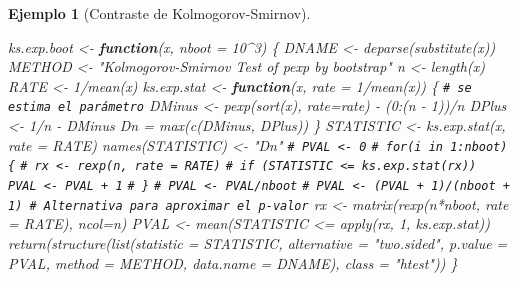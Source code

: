 \documentclass[
  10pt,
]{book}
\newenvironment{Shaded}{\begin{snugshade}}{\end{snugshade}}
\newcommand{\AttributeTok}[1]{\textcolor[rgb]{0.77,0.63,0.00}{#1}}
\newcommand{\CommentTok}[1]{\textcolor[rgb]{0.56,0.35,0.01}{\textit{#1}}}
\newcommand{\ControlFlowTok}[1]{\textcolor[rgb]{0.13,0.29,0.53}{\textbf{#1}}}
\newcommand{\DecValTok}[1]{\textcolor[rgb]{0.00,0.00,0.81}{#1}}
\newcommand{\FunctionTok}[1]{\textcolor[rgb]{0.00,0.00,0.00}{#1}}
\newcommand{\NormalTok}[1]{#1}
\newcommand{\OtherTok}[1]{\textcolor[rgb]{0.56,0.35,0.01}{#1}}
\newcommand{\SpecialCharTok}[1]{\textcolor[rgb]{0.00,0.00,0.00}{#1}}
\newcommand{\StringTok}[1]{\textcolor[rgb]{0.31,0.60,0.02}{#1}}
\theoremstyle{break}
\newtheorem{example}{Ejemplo}[chapter]
\theoremstyle{nonumberplain}
\renewcommand{\CommentTok}[1]{\textcolor[rgb]{0.41,0.41,0.41}{\texttt{#1}}}
\begin{document}
\begin{example}[Contraste de Kolmogorov-Smirnov]
\begin{Shaded}
\begin{Highlighting}[]
\NormalTok{ks.exp.boot }\OtherTok{\textless{}{-}} \ControlFlowTok{function}\NormalTok{(x, }\AttributeTok{nboot =} \DecValTok{10}\SpecialCharTok{\^{}}\DecValTok{3}\NormalTok{) \{}
\NormalTok{  DNAME }\OtherTok{\textless{}{-}} \FunctionTok{deparse}\NormalTok{(}\FunctionTok{substitute}\NormalTok{(x))}
\NormalTok{  METHOD }\OtherTok{\textless{}{-}} \StringTok{"Kolmogorov{-}Smirnov Test of pexp by bootstrap"} 
\NormalTok{  n }\OtherTok{\textless{}{-}} \FunctionTok{length}\NormalTok{(x)}
\NormalTok{  RATE }\OtherTok{\textless{}{-}} \DecValTok{1}\SpecialCharTok{/}\FunctionTok{mean}\NormalTok{(x)}
\NormalTok{  ks.exp.stat }\OtherTok{\textless{}{-}} \ControlFlowTok{function}\NormalTok{(x, }\AttributeTok{rate =} \DecValTok{1}\SpecialCharTok{/}\FunctionTok{mean}\NormalTok{(x)) \{ }\CommentTok{\# se estima el parámetro}
\NormalTok{    DMinus }\OtherTok{\textless{}{-}} \FunctionTok{pexp}\NormalTok{(}\FunctionTok{sort}\NormalTok{(x), }\AttributeTok{rate=}\NormalTok{rate) }\SpecialCharTok{{-}}\NormalTok{ (}\DecValTok{0}\SpecialCharTok{:}\NormalTok{(n }\SpecialCharTok{{-}} \DecValTok{1}\NormalTok{))}\SpecialCharTok{/}\NormalTok{n}
\NormalTok{    DPlus }\OtherTok{\textless{}{-}} \DecValTok{1}\SpecialCharTok{/}\NormalTok{n }\SpecialCharTok{{-}}\NormalTok{ DMinus}
\NormalTok{    Dn }\OtherTok{=} \FunctionTok{max}\NormalTok{(}\FunctionTok{c}\NormalTok{(DMinus, DPlus))}
\NormalTok{  \}  }
\NormalTok{  STATISTIC }\OtherTok{\textless{}{-}} \FunctionTok{ks.exp.stat}\NormalTok{(x, }\AttributeTok{rate =}\NormalTok{ RATE) }
  \FunctionTok{names}\NormalTok{(STATISTIC) }\OtherTok{\textless{}{-}} \StringTok{"Dn"}
  \CommentTok{\# PVAL \textless{}{-} 0}
  \CommentTok{\# for(i in 1:nboot) \{}
  \CommentTok{\#   rx \textless{}{-} rexp(n, rate = RATE)}
  \CommentTok{\#   if (STATISTIC \textless{}= ks.exp.stat(rx)) PVAL \textless{}{-} PVAL + 1}
  \CommentTok{\# \}}
  \CommentTok{\# PVAL \textless{}{-} PVAL/nboot}
  \CommentTok{\# PVAL \textless{}{-} (PVAL + 1)/(nboot + 1) \# Alternativa para aproximar el p{-}valor}
\NormalTok{  rx }\OtherTok{\textless{}{-}} \FunctionTok{matrix}\NormalTok{(}\FunctionTok{rexp}\NormalTok{(n}\SpecialCharTok{*}\NormalTok{nboot, }\AttributeTok{rate =}\NormalTok{ RATE), }\AttributeTok{ncol=}\NormalTok{n)}
\NormalTok{  PVAL }\OtherTok{\textless{}{-}} \FunctionTok{mean}\NormalTok{(STATISTIC }\SpecialCharTok{\textless{}=} \FunctionTok{apply}\NormalTok{(rx, }\DecValTok{1}\NormalTok{, ks.exp.stat))}
  \FunctionTok{return}\NormalTok{(}\FunctionTok{structure}\NormalTok{(}\FunctionTok{list}\NormalTok{(}\AttributeTok{statistic =}\NormalTok{ STATISTIC, }\AttributeTok{alternative =} \StringTok{"two.sided"}\NormalTok{, }
                   \AttributeTok{p.value =}\NormalTok{ PVAL, }\AttributeTok{method =}\NormalTok{ METHOD, }\AttributeTok{data.name =}\NormalTok{ DNAME), }
                   \AttributeTok{class =} \StringTok{"htest"}\NormalTok{))}
\NormalTok{\}}
\end{Highlighting}
\end{Shaded}


\end{example}
\end{document}

